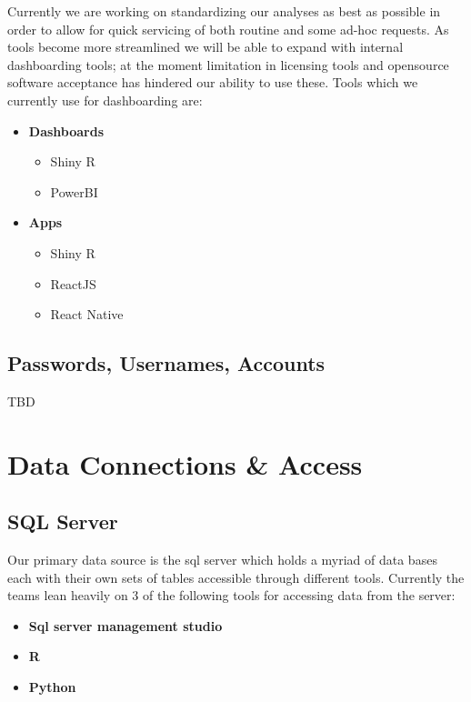 \documentclass[
]{book}
\begin{document}
Currently we are working on standardizing our analyses as best as possible in order to allow for quick servicing of both routine and some ad-hoc requests. As tools become more streamlined we will be able to expand with internal dashboarding tools; at the moment limitation in licensing tools and opensource software acceptance has hindered our ability to use these. Tools which we currently use for dashboarding are:

\begin{itemize}
\item
  \textbf{Dashboards}

  \begin{itemize}
  \item
    Shiny R
  \item
    PowerBI
  \end{itemize}
\item
  \textbf{Apps}

  \begin{itemize}
  \item
    Shiny R
  \item
    ReactJS
  \item
    React Native
  \end{itemize}
\end{itemize}

\hypertarget{passwords-usernames-accounts}{%
\section{Passwords, Usernames, Accounts}\label{passwords-usernames-accounts}}

TBD

\hypertarget{data-connections-access}{%
\chapter{Data Connections \& Access}\label{data-connections-access}}

\hypertarget{sql-server}{%
\section{SQL Server}\label{sql-server}}

Our primary data source is the sql server which holds a myriad of data bases each with their own sets of tables accessible through different tools. Currently the teams lean heavily on 3 of the following tools for accessing data from the server:

\begin{itemize}
\item
  \textbf{Sql server management studio}
\item
  \textbf{R}
\item
  \textbf{Python}
\end{itemize}
\end{document}
